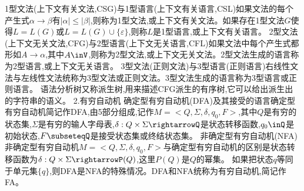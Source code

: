 1型文法(上下文有关文法,CSG)与1型语言(上下文有关语言,CSL)如果文法的每个产生式$\alpha\rightarrow\beta$有$|\alpha|\leqslant|\beta|$,则称为1型文法,或上下文有关文法。如果存在1型文法$G$使得$L=L(G)$或$L=L(G)\cup\{\varepsilon\}$,则称$L$是1型语言,或上下文有关语言。
2型文法(上下文无关文法,CFG)与2型语言(上下文无关语言,CFL)如果文法中每个产生式都形如$A\rightarrow\alpha$,其中$A\inV$,则称为2型文法,或上下文无关文法。2型文法生成的语言称为2型语言,或上下文无关语言。
3型文法(正则文法)与3型语言(正则语言)右线性文法与左线性文法统称为3型文法或正则文法。3型文法生成的语言称为3型语言或正则语言。
语法分析树又称派生树,用来描述CFG派生的有序树,它可以给出派生出的字符串的语义。
{2.有穷自动机}
确定型有穷自动机(DFA)及其接受的语言确定型有穷自动机简记作DFA,由5部分组成,记作$M=<Q,\Sigma,\delta,q_{0},F>$,其中$Q$是有穷的状态集,$\Sigma$是有穷的输人字母表,$\delta:Q\times\Sigma\rightarrowQ$是状态转移函数,$q_{0}\inQ$是初始状态,$F\subseteqQ$是接受状态集或终结状态集。
非确定型有穷自动机(NFA)非确定型有穷自动机$M=<Q,\Sigma,\delta,q_{0},F>$与确定型有穷自动机的区别是状态转移函数为$\delta:Q\times\Sigma\rightarrowP(Q)$,这里$P(Q)$是$Q$的幂集。
如果把状态$q$等同于单元集$\{q\}$,则DFA是NFA的特殊情况。DFA和NFA统称为有穷自动机,简记作FA。
